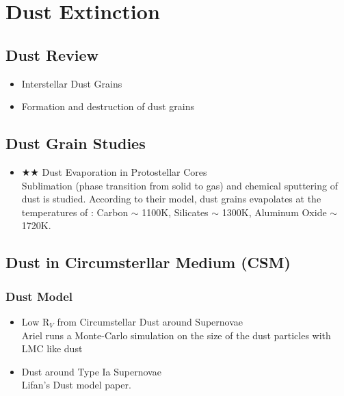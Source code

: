\chapter{Dust Extinction}
\section{Dust Review}
\begin{itemize}
\item Interstellar Dust Grains \citep[][\#451, 5/18/10, draine03a]{draine03a}\\
\item Formation and destruction of dust grains \citep[][\#193, 5/20/10, salpeter77a]{salpeter77a}
\end{itemize}

\section{Dust Grain Studies}
\begin{itemize}
\item $\bigstar\bigstar$ Dust Evaporation in Protostellar Cores
\citep[][]{lenzuni95a} \\
Sublimation (phase transition from solid to gas) and chemical sputtering
of dust is studied.  According to their model, dust grains evapolates
at the temperatures of :
Carbon $\sim$ 1100K, Silicates $\sim$ 1300K, Aluminum Oxide $\sim$ 1720K.
\end{itemize}

\section{Dust in Circumsterllar Medium (CSM)}
\subsection{Dust Model}
\begin{itemize}
\item  Low R$_{V}$ from Circumstellar Dust around Supernovae \citep{goobar08a}\\
Ariel runs a Monte-Carlo simulation on the size of the dust particles with LMC
like dust
\item Dust around Type Ia Supernovae \citep[][\#39, 5/14/10, wang05b]{wang05b}\\
Lifan's Dust model paper.
\end{itemize}

